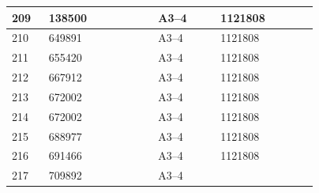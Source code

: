 \documentclass[UTF8,10pt,a4paper,fontset=fandol]{ctexart}
\newcommand{\fieldvalue}[1]{#1}
\begin{document}
\begin{center}
\begin{tabular}{|p{0.08\linewidth}|p{0.28\linewidth}|p{0.16\linewidth}|p{0.25\linewidth}|}
209 &
\fieldvalue{138500} &
\fieldvalue{A3--4} &
\fieldvalue{1121808} & \\ \hline
210 &
\fieldvalue{649891} &
\fieldvalue{A3--4} &
\fieldvalue{1121808} & \\ \hline
211 &
\fieldvalue{655420} &
\fieldvalue{A3--4} &
\fieldvalue{1121808} & \\ \hline
212 &
\fieldvalue{667912} &
\fieldvalue{A3--4} &
\fieldvalue{1121808} & \\ \hline
213 &
\fieldvalue{672002} &
\fieldvalue{A3--4} &
\fieldvalue{1121808} & \\ \hline
214 &
\fieldvalue{672002} &
\fieldvalue{A3--4} &
\fieldvalue{1121808} & \\ \hline
215 &
\fieldvalue{688977} &
\fieldvalue{A3--4} &
\fieldvalue{1121808} & \\ \hline
216 &
\fieldvalue{691466} &
\fieldvalue{A3--4} &
\fieldvalue{1121808} & \\ \hline
217 &
\fieldvalue{709892} &
\fieldvalue{A3--4} &

\end{tabular}
\end{center}
\end{document}
